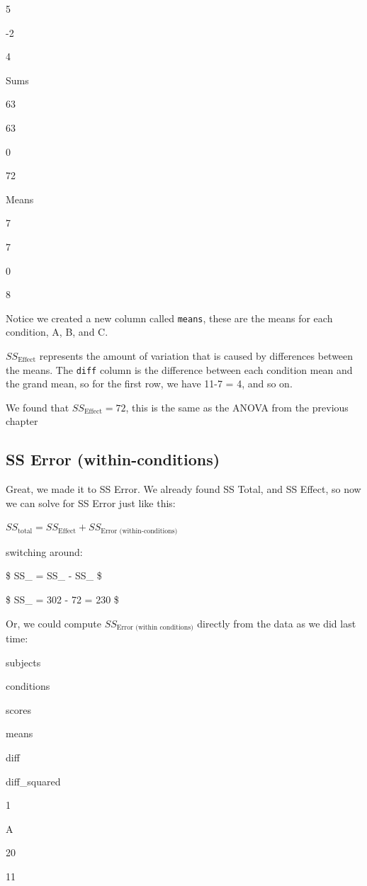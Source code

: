 \documentclass[
]{book}
\begin{document}
5

-2

4

Sums

63

63

0

72

Means

7

7

0

8

Notice we created a new column called \texttt{means}, these are the means for each condition, A, B, and C.

\(SS_\text{Effect}\) represents the amount of variation that is caused by differences between the means. The \texttt{diff} column is the difference between each condition mean and the grand mean, so for the first row, we have 11-7 = 4, and so on.

We found that \(SS_\text{Effect} = 72\), this is the same as the ANOVA from the previous chapter

\hypertarget{ss-error-within-conditions}{%
\subsection{SS Error (within-conditions)}\label{ss-error-within-conditions}}

Great, we made it to SS Error. We already found SS Total, and SS Effect, so now we can solve for SS Error just like this:

\(SS_\text{total} = SS_\text{Effect} + SS_\text{Error (within-conditions)}\)

switching around:

\$ SS\_ = SS\_ - SS\_ \$

\$ SS\_ = 302 - 72 = 230 \$

Or, we could compute \(SS_\text{Error (within conditions)}\) directly from the data as we did last time:

subjects

conditions

scores

means

diff

diff\_squared

1

A

20

11
\end{document}
